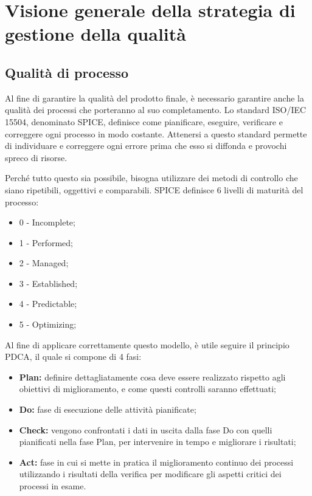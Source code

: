 \newpage
\section{Visione generale della strategia di gestione della qualità}

	\subsection{Qualità di processo}
	Al fine di garantire la qualità del prodotto finale, è necessario garantire anche la qualità dei processi che porteranno al suo completamento. Lo standard ISO/IEC 15504, denominato SPICE, definisce come pianificare, eseguire, verificare e correggere ogni processo in modo costante. 
	Attenersi a questo standard permette di individuare e correggere ogni errore prima che esso si diffonda e provochi spreco di risorse. 
	
	Perché tutto questo sia possibile, bisogna utilizzare dei metodi di controllo che siano ripetibili, oggettivi e comparabili. SPICE definisce 6 livelli di maturità del processo:
	
	\begin{itemize}
		\item 0 - Incomplete;
		\item 1 - Performed;
		\item 2 - Managed;
		\item 3 - Established;
		\item 4 - Predictable;
		\item 5 - Optimizing;
	\end{itemize}
	
	Al fine di applicare correttamente questo modello, è utile seguire il principio PDCA, il quale si compone di 4 fasi:
	
	\begin{itemize}
		\item \textbf{Plan: }definire dettagliatamente cosa deve essere realizzato rispetto agli obiettivi di miglioramento, e come questi controlli saranno effettuati;
		\item \textbf{Do: }fase di esecuzione delle attività pianificate;
		\item \textbf{Check: }vengono confrontati i dati in uscita dalla fase Do con quelli pianificati nella fase Plan, per intervenire in tempo e migliorare i risultati;
		\item \textbf{Act: }fase in cui si mette in pratica il miglioramento continuo dei processi utilizzando i risultati della verifica per modificare gli aspetti critici dei processi in esame.
	\end{itemize}


